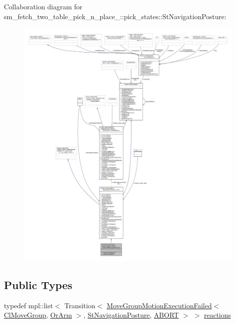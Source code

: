 Collaboration diagram for sm\+\_\+fetch\+\_\+two\+\_\+table\+\_\+pick\+\_\+n\+\_\+place\+\_\+:\+:pick\+\_\+states\+:\+:St\+Navigation\+Posture\+:
\nopagebreak
\begin{figure}[H]
\begin{center}
\leavevmode
\includegraphics[width=350pt]{structsm__fetch__two__table__pick__n__place__1_1_1pick__states_1_1StNavigationPosture__coll__graph}
\end{center}
\end{figure}
\subsection*{Public Types}
\begin{DoxyCompactItemize}
\item 
typedef mpl\+::list$<$ Transition$<$ \hyperlink{structmove__group__interface__client_1_1MoveGroupMotionExecutionFailed}{Move\+Group\+Motion\+Execution\+Failed}$<$ \hyperlink{classmove__group__interface__client_1_1ClMoveGroup}{Cl\+Move\+Group}, \hyperlink{classsm__fetch__two__table__pick__n__place__1_1_1OrArm}{Or\+Arm} $>$, \hyperlink{structsm__fetch__two__table__pick__n__place__1_1_1pick__states_1_1StNavigationPosture}{St\+Navigation\+Posture}, \hyperlink{classABORT}{A\+B\+O\+RT} $>$ $>$ \hyperlink{structsm__fetch__two__table__pick__n__place__1_1_1pick__states_1_1StNavigationPosture_a1ed2aca740ca1806a83b8cb8cf0e80ea}{reactions}
\end{DoxyCompactItemize}
